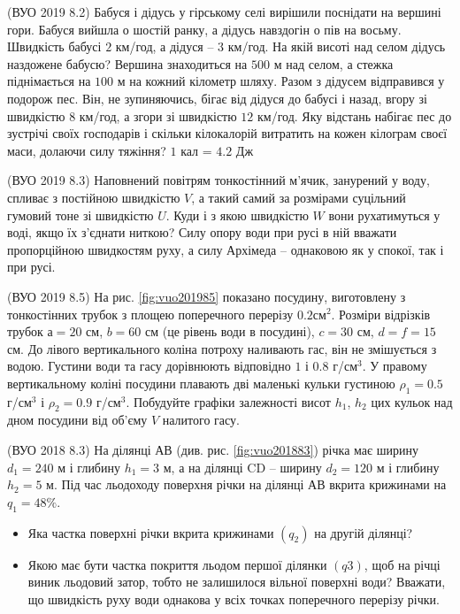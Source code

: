 \justifying

\begin{problem}{1}
	(ВУО 2019 8.2)
	Бабуся і дідусь у гірському селі вирішили поснідати на вершині гори. Бабуся
	вийшла о шостій ранку, а дідусь навздогін о пів на восьму. Швидкість бабусі
	$2$ км/год, а дідуся – $3$ км/год. На якій висоті над селом дідусь наздожене бабусю?
	Вершина знаходиться на $500$ м над селом, а стежка піднімається на $100$ м на кожний
	кілометр шляху. Разом з дідусем відправився у подорож пес. Він, не зупиняючись,
	бігає від дідуся до бабусі і назад, вгору зі швидкістю $8$ км/год, а згори зі швидкістю
	$12$ км/год. Яку відстань набігає пес до зустрічі своїх господарів і скільки кілокалорій витратить на кожен кілограм своєї маси, долаючи силу тяжіння? $1$ кал = $4.2$ Дж
\end{problem}

\begin{problem}{2}
	(ВУО 2019 8.3)
	Наповнений повітрям тонкостінний м’ячик, занурений у воду, спливає з постійною швидкістю $V$, а такий самий за розмірами суцільний гумовий тоне зі швидкістю
	$U$. Куди і з якою швидкістю $W$ вони рухатимуться у воді, якщо їх з'єднати ниткою?
	Силу опору води при русі в ній вважати пропорційною швидкостям руху, а силу
	Архімеда – однаковою як у спокої, так і при русі.
\end{problem}

\begin{problem}{3}
	(ВУО 2019 8.5)
	На рис. \ref{fig:vuo201985} показано посудину, виготовлену з тонкостінних трубок з
	площею поперечного перерізу $0.2 \text{см}^2$. Розміри відрізків трубок $а = 20$ см,
	$b = 60$ см (це рівень води в посудині), $c = 30$ см, $d = f = 15$ см. До лівого вертикального коліна потроху наливають гас, він не змішується з водою. Густини
	води та гасу дорівнюють відповідно $1$ і $0.8$ г/$\text{см}^3$. У правому вертикальному коліні
	посудини плавають дві маленькі кульки густиною $\rho_1 = 0.5$ г/$\text{см}^3$ і $\rho_2 = 0.9$ г/$\text{см}^3$. Побудуйте графіки залежності висот $h_1$, $h_2$ цих кульок над дном посудини від об’єму $V$
	налитого гасу.
\end{problem}

\begin{problem}{4}
	(ВУО 2018 8.3)
	На ділянці АВ (див. рис. \ref{fig:vuo201883}) річка має ширину $d_1 = 240$ м і глибину $h_1 = 3$ м, а на ділянці CD – ширину $d_2 = 120$ м і глибину $h_2 = 5$ м. Під час льодоходу поверхня річки на ділянці АВ вкрита крижинами на $q_1 = 48 \%$. 
	\begin{itemize}
		\item Яка частка поверхні річки вкрита крижинами $(q_2)$ на другій ділянці?
		\item Якою має бути частка покриття льодом першої ділянки $(q3)$, щоб на річці виник льодовий затор, тобто не залишилося вільної поверхні води? Вважати, що швидкість руху води однакова у всіх точках поперечного перерізу річки.
	\end{itemize}
\end{problem}

